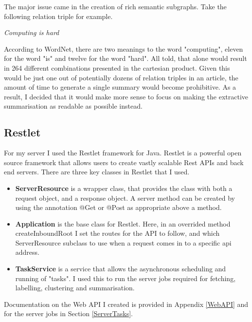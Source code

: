 \documentclass[12pt]{article}
\begin{document}
The major issue came in the creation of rich semantic subgraphs. Take the following relation triple for example.\\

\begin{displayquote}\emph{
Computing is hard\\}
\end{displayquote}

According to WordNet, there are two meanings to the word "computing", eleven for the word "is" and twelve for the word "hard". All told, that alone would result in 264 different combinations presented in the cartesian product. Given this would be just one out of potentially dozens of relation triples in an article, the amount of time to generate a single summary would become prohibitive. As a result, I decided that it would make more sense to focus on making the extractive summarisation as readable as possible instead. 

\subsection{Restlet}

\label{Restlet}

For my server I used the Restlet \cite{restlet} framework for Java. Restlet is a powerful open source framework that allows users to create vastly scalable Rest APIs and back end servers. There are three key classes in Restlet that I used.\\

\begin{itemize}
	\item \textbf{ServerResource} is a wrapper class, that provides the class with both a request object, and a response object. A server method can be created by using the annotation @Get or @Post as appropriate above a method. 
	\item \textbf{Application} is the base class for Restlet. Here, in an overrided method createInboundRoot I set the routes for the API to follow, and which ServerResource subclass to use when a request comes in to a specific api address. 
	\item \textbf{TaskService} is a service that allows the asynchronous scheduling and running of "tasks". I used this to run the server jobs required for fetching, labelling, clustering and summarisation. 
\end{itemize}

Documentation on the Web API I created is provided in Appendix \ref{WebAPI} and for the server jobs in Section \ref{ServerTasks}.
\end{document}
